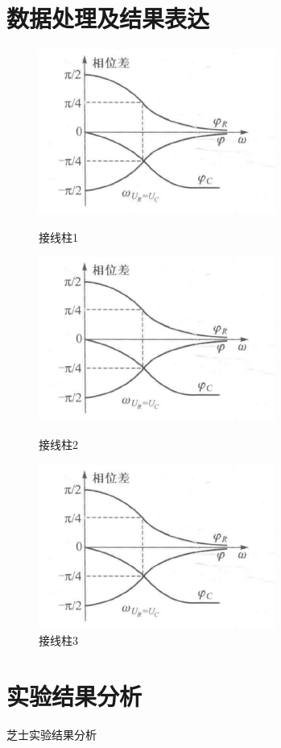 \section{数据处理及结果表达}
\begin{figure}[htbp]
	\centering
	\begin{minipage}{0.3\linewidth}
		\centering
		\includegraphics[width=0.5\linewidth]{figure/114.png}
		\caption*{接线柱1}
	\end{minipage}
	\begin{minipage}{0.3\linewidth}
		\centering
		\includegraphics[width=0.5\linewidth]{figure/114.png}
		\caption*{接线柱2}
	\end{minipage}
	\begin{minipage}{0.3\linewidth}
		\centering
		\includegraphics[width=0.5\linewidth]{figure/114.png}
		\caption*{接线柱3}
	\end{minipage}
\end{figure}
\section{实验结果分析}
芝士实验结果分析
